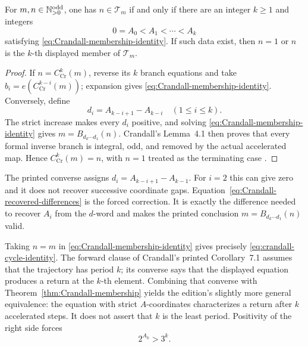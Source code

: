 \begin{theorem}
\label{thm:Crandall-membership}
For $m,n\in\mathbb{N}_{>0}^{\mathrm{odd}}$, one has $n\in\mathcal T_m$ if and only if there are an
integer $k\geq1$ and integers
\[
 0=A_0<A_1<\cdots<A_k
\]
satisfying \eqref{eq:Crandall-membership-identity}.  If such data exist, then
$n=1$ or $n$ is the $k$-th displayed member of $\mathcal T_m$.
\end{theorem}

\begin{proof}
If $n=C_{\mathrm{Cr}}^k(m)$, reverse its $k$ branch equations and take
$b_i=e(C_{\mathrm{Cr}}^{k-i}(m))$; expansion gives
\eqref{eq:Crandall-membership-identity}.  Conversely, define
\begin{equation}
\label{eq:Crandall-recovered-differences}
 d_i=A_{k-i+1}-A_{k-i}\quad(1\leq i\leq k).
\end{equation}
The strict increase makes every $d_i$ positive, and solving
\eqref{eq:Crandall-membership-identity} gives
$m=B_{d_k\cdots d_1}(n)$.  Crandall's Lemma~4.1 then proves that every
formal inverse branch is integral, odd, and removed by the actual accelerated
map.  Hence $C_{\mathrm{Cr}}^k(m)=n$, with $n=1$ treated as the terminating
case \cite[pp.~1287--1288, Eq.~(7.2), Thm.~7.1]{Crandall1978}.
\end{proof}

\begin{sourceissue}
\label{sourceissue:Crandall-theorem71-index}
The printed converse assigns
$d_i=A_{k-i+1}-A_{k-1}$.  For $i=2$ this can give zero and it does not recover
successive coordinate gaps.  Equation~\eqref{eq:Crandall-recovered-differences}
is the forced correction.  It is exactly the difference needed to recover
$A_i$ from the $d$-word and makes the printed conclusion
$m=B_{d_k\cdots d_1}(n)$ valid.
\end{sourceissue}

Taking $n=m$ in \eqref{eq:Crandall-membership-identity} gives precisely
\eqref{eq:crandall-cycle-identity}.  The forward clause of Crandall's printed
Corollary~7.1 assumes that the trajectory has period $k$; its converse says
that the displayed equation produces a return at the $k$-th element.
Combining that converse with Theorem~\ref{thm:Crandall-membership} yields the
edition's slightly more general equivalence: the equation with strict
$A$-coordinates characterizes a return after $k$ accelerated steps.  It does
not assert that $k$ is the least period.  Positivity of the right side forces
\begin{equation}
\label{eq:Crandall-positive-cycle-denominator}
 2^{A_k}>3^k.
\end{equation}

